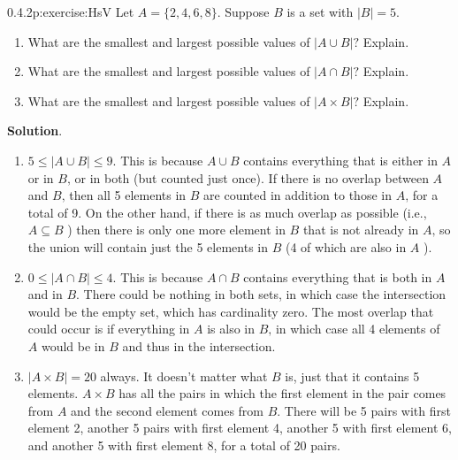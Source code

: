 \documentclass[twoside,11pt,]{book}
\newcommand{\blocktitlefont}{\relax}
\numberwithin{equation}{chapter}
\begin{document}
\begin{divisionsolution}{0.4.2}{}{p:exercise:HsV}%
Let \(A = \{2, 4, 6, 8\}\text{.}\) Suppose \(B\) is a set with \(|B| = 5\text{.}\)%
\begin{enumerate}[label=(\alph*)]
\item{}What are the smallest and largest possible values of \(|A \cup B|\text{?}\) Explain.%
\item{}What are the smallest and largest possible values of \(|A \cap B|\text{?}\) Explain.%
\item{}What are the smallest and largest possible values of \(|A \times B|\text{?}\) Explain.%
\end{enumerate}
%
\par\smallskip%
\noindent\textbf{\blocktitlefont Solution}.\quad{}%
\begin{enumerate}[label=(\alph*)]
\item{}\(5 \le |A\cup B| \le 9\text{.}\) This is because \(A \cup B\) contains everything that is either in \(A\) or in \(B\text{,}\) or in both (but counted just once). If there is no overlap between \(A\) and \(B\text{,}\) then all 5 elements in \(B\) are counted in addition to those in \(A\text{,}\) for a total of 9. On the other hand, if there is as much overlap as possible (i.e., \(A \subseteq B\) ) then there is only one more element in \(B\) that is not already in \(A\text{,}\) so the union will contain just the 5 elements in \(B\) (4 of which are also in \(A\) ).%
\item{}\(0 \le |A \cap B| \le 4\text{.}\) This is because \(A \cap B\) contains everything that is both in \(A\) and in \(B\text{.}\) There could be nothing in both sets, in which case the intersection would be the empty set, which has cardinality zero. The most overlap that could occur is if everything in \(A\) is also in \(B\text{,}\) in which case all 4 elements of \(A\) would be in \(B\) and thus in the intersection.%
\item{}\(|A \times B| = 20\) always. It doesn't matter what \(B\) is, just that it contains 5 elements. \(A \times B\) has all the pairs in which the first element in the pair comes from \(A\) and the second element comes from \(B\text{.}\) There will be 5 pairs with first element 2, another 5 pairs with first element 4, another 5 with first element 6, and another 5 with first element 8, for a total of 20 pairs.%
\end{enumerate}
%
\end{divisionsolution}%
\end{document}
